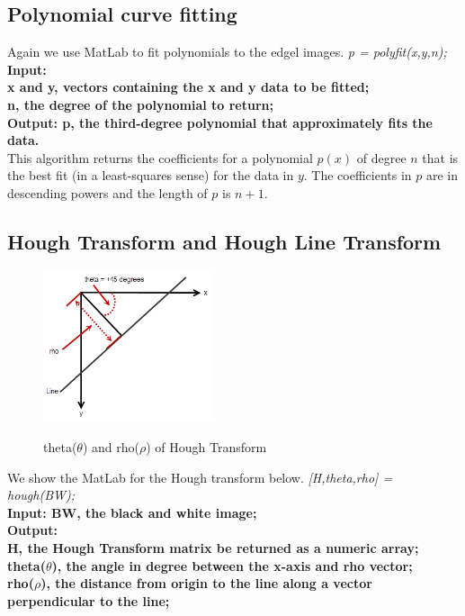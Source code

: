 \subsection{Polynomial curve fitting}

Again we use MatLab to fit polynomials to the edgel images.
\vspace{3mm}
\textit{p = polyfit(x,y,n);}\\
\newline
\textbf{Input: \\x and y, vectors containing the x and y data to be fitted;\\ n, the degree of the polynomial to return;}\\
\textbf{Output: p, the third-degree polynomial that approximately fits the data.}\\
\newline
This algorithm returns the coefficients for a polynomial $p(x)$ of degree $n$
that is the best fit (in a least-squares sense) for the data in $y$. The
coefficients in $p$ are in descending powers and the length of $p$ is $n+1$.


\subsection{Hough Transform and Hough Line Transform\cite{Wikipedia}}

\begin{figure}
\includegraphics[width=5cm]{pic/SHT-example.png}\\
\caption{theta($\theta$) and rho($\rho$) of Hough Transform}
\label{fig1}
\end{figure}
We show the MatLab for the Hough transform below.
\vspace{3mm}
\textit{[H,theta,rho] = hough(BW);}\\
\newline
\textbf{Input: BW, the black and white image;}\\
\textbf{Output:\\ H, the Hough Transform matrix be returned as a numeric array;}\\
\textbf{theta($\theta$), the angle in degree between the x-axis and rho vector;}\\
\textbf{rho($\rho$), the distance from origin to the line along a vector perpendicular to the line;}\\

